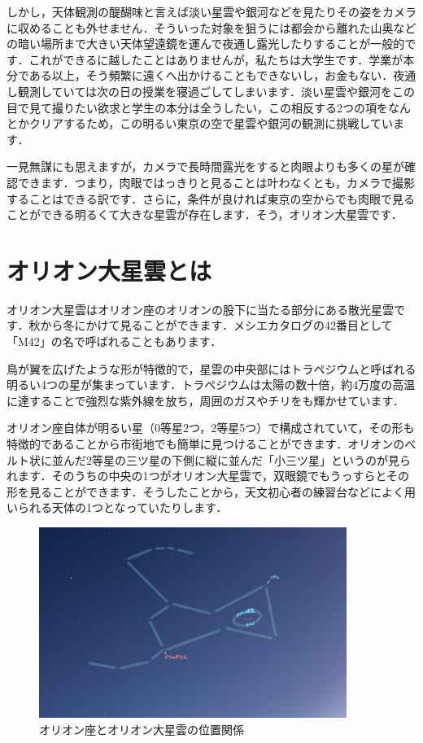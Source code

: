 \documentclass[supernova_2023]{subfiles}
\begin{document}
しかし，天体観測の醍醐味と言えば淡い星雲や銀河などを見たりその姿をカメラに収めることも外せません．そういった対象を狙うには都会から離れた山奥などの暗い場所まで大きい天体望遠鏡を運んで夜通し露光したりすることが一般的です．これができるに越したことはありませんが，私たちは大学生です．学業が本分である以上，そう頻繁に遠くへ出かけることもできないし，お金もない．夜通し観測していては次の日の授業を寝過ごしてしまいます．淡い星雲や銀河をこの目で見て撮りたい欲求と学生の本分は全うしたい，この相反する2つの項をなんとかクリアするため，この明るい東京の空で星雲や銀河の観測に挑戦しています．

一見無謀にも思えますが，カメラで長時間露光をすると肉眼よりも多くの星が確認できます．つまり，肉眼ではっきりと見ることは叶わなくとも，カメラで撮影することはできる訳です．さらに，条件が良ければ東京の空からでも肉眼で見ることができる明るくて大きな星雲が存在します．そう，オリオン大星雲です．
\section{オリオン大星雲とは}
オリオン大星雲はオリオン座のオリオンの股下に当たる部分にある散光星雲です．秋から冬にかけて見ることができます．メシエカタログの42番目として「M42」の名で呼ばれることもあります．

鳥が翼を広げたような形が特徴的で，星雲の中央部にはトラペジウムと呼ばれる明るい4つの星が集まっています．トラペジウムは太陽の数十倍，約4万度の高温に達することで強烈な紫外線を放ち，周囲のガスやチリをも輝かせています．

オリオン座自体が明るい星（0等星2つ，2等星5つ）で構成されていて，その形も特徴的であることから市街地でも簡単に見つけることができます．オリオンのベルト状に並んだ2等星の三ツ星の下側に縦に並んだ「小三ツ星」というのが見られます．そのうちの中央の1つがオリオン大星雲で，双眼鏡でもうっすらとその形を見ることができます．そうしたことから，天文初心者の練習台などによく用いられる天体の1つとなっていたりします．
\begin{figure}
  \centering
  \includegraphics[width=10cm]{figures/Yosuke/Orion_line-2.jpg}
  \caption{オリオン座とオリオン大星雲の位置関係}
  \label{fig:Orion}
\end{figure}
\end{document}
